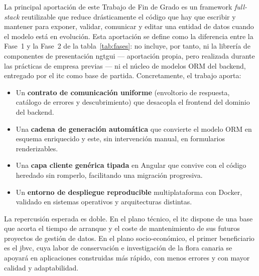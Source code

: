 La principal aportación de este Trabajo de Fin de Grado es un framework
\emph{full-stack} reutilizable que reduce drásticamente el código que hay que
escribir y mantener para exponer, validar, comunicar y editar una entidad de
datos cuando el modelo está en evolución. Esta aportación se define como la
diferencia entre la Fase~1 y la Fase~2 de la tabla~\ref{tab:fases}: no incluye,
por tanto, ni la librería de componentes de presentación \gls{ngtgui}
--- aportación propia, pero realizada durante las prácticas de empresa
previas --- ni el núcleo de modelos ORM del backend, entregado por el
\gls{itc} como base de partida. Concretamente, el trabajo aporta:

\begin{itemize}
  \item Un \textbf{contrato de comunicación uniforme} (envoltorio de
  respuesta, catálogo de errores y descubrimiento) que desacopla el frontend
  del dominio del backend.
  \item Una \textbf{cadena de generación automática} que convierte el modelo
  ORM en esquema enriquecido y este, sin intervención manual, en formularios
  renderizables.
  \item Una \textbf{capa cliente genérica tipada} en Angular que convive con
  el código heredado sin romperlo, facilitando una migración progresiva.
  \item Un \textbf{entorno de despliegue reproducible} multiplataforma con
  Docker, validado en sistemas operativos y arquitecturas distintas.
\end{itemize}

La repercusión esperada es doble. En el plano técnico, el \gls{itc} dispone de
una base que acorta el tiempo de arranque y el coste de mantenimiento de sus
futuros proyectos de gestión de datos. En el plano
socio-económico, el primer beneficiario es el \gls{jbvc}, cuya labor de
conservación e investigación de la flora canaria se apoyará en aplicaciones
construidas más rápido, con menos errores y con mayor calidad y adaptabilidad.
